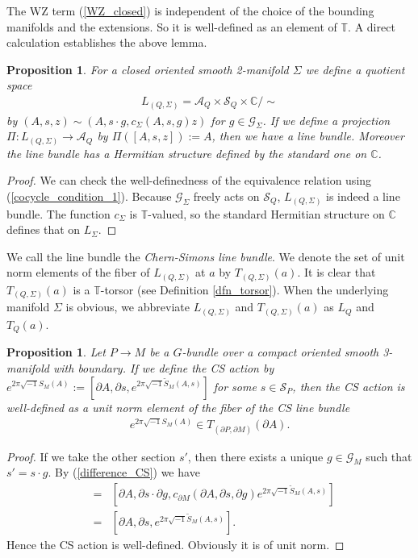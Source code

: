 \documentclass[a4paper,a4paper]{article}
\newtheorem{prop}[thm]{Proposition}
\theoremstyle{definition}
\theoremstyle{remark}
\newcommand{\C}{\mathbb{C}}
\newcommand{\T}{\mathbb{T}}
\newcommand{\A}{\mathcal{A}}
\newcommand{\G}{\mathcal{G}}
\renewcommand{\S}{\mathcal{S}}
\begin{document}
The WZ term (\ref{WZ_closed}) is independent of the choice of the bounding manifolds and the extensions. So it is well-defined as an element of $\T$. A direct calculation establishes the above lemma.

\begin{prop} \label{thm_cslinebundle}
For a closed oriented smooth 2-manifold $\Sigma$ we define a quotient space 
\begin{eqnarray}
L_{(Q,\Sigma)} = \A_Q \times \S_Q \times \C / \sim 
\end{eqnarray}
by $(A, s, z) \sim (A, s \cdot g, c_\Sigma(A,s,g) z)$ for $g \in \G_\Sigma$. If we define a projection $\Pi : L_{(Q,\Sigma)} \to \A_Q$ by $\Pi([A,s,z]) := A$, then we have a line bundle. Moreover the line bundle has a Hermitian structure defined by the standard one on $\C$.
\end{prop}

\begin{proof}
We can check the well-definedness of the equivalence relation using (\ref{cocycle_condition_1}). Because $\G_\Sigma$ freely acts on $\S_Q$, $L_{(Q, \Sigma)}$ is indeed a line bundle. The function $c_\Sigma$ is $\T$-valued, so the standard Hermitian structure on $\C$ defines that on $L_\Sigma$.
\end{proof}

We call the line bundle the \textit{Chern-Simons line bundle}. We denote the set of unit norm elements of the fiber of $L_{(Q, \Sigma)}$ at $a$ by $T_{(Q, \Sigma)}(a)$. It is clear that $T_{(Q, \Sigma)}(a)$ is a $\T$-torsor (see Definition \ref{dfn_torsor}). When the underlying manifold $\Sigma$ is obvious, we abbreviate $L_{(Q, \Sigma)}$ and $T_{(Q, \Sigma)}(a)$ as $L_Q$ and $T_Q(a)$.

\begin{prop} \label{thm_csaction_boundary}
Let $P \to M$ be a $G$-bundle over a compact oriented smooth 3-manifold with boundary. If we define the \textit{CS action} by $e^{ 2\pi\sqrt{-1} S_M(A) } := [ \partial A, \partial s, e^{ 2\pi\sqrt{-1} \tilde{S}_M(A,s)} ]$ for some $s \in \S_P$, then the CS action is well-defined as a unit norm element of the fiber of the CS line bundle 
\begin{eqnarray}
e^{ 2\pi\sqrt{-1} S_M(A) } \in T_{(\partial P, \partial M)}(\partial A).
\end{eqnarray}
\end{prop}

\begin{proof}
If we take the other section $s'$, then there exists a unique $g \in \G_M$ such that $s' = s \cdot g$. By (\ref{difference_CS}) we have
\begin{eqnarray*}
[\partial A, \partial s', e^{ 2\pi\sqrt{-1} \tilde{S}_M(A,s')} ] 
& = &
[\partial A, \partial s \cdot \partial g, 
c_{\partial M}(\partial A, \partial s, \partial g)
e^{ 2\pi\sqrt{-1} \tilde{S}_M(A,s)} ] \\
& = & 
[\partial A, \partial s, e^{ 2\pi\sqrt{-1} \tilde{S}_M(A,s)} ] .
\end{eqnarray*}
Hence the CS action is well-defined. Obviously it is of unit norm.
\end{proof}
\end{document}
